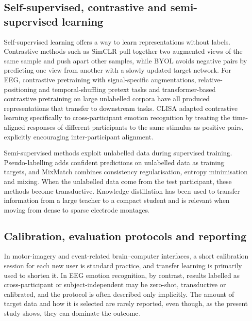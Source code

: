 \subsection{Self-supervised, contrastive and semi-supervised learning}
Self-supervised learning offers a way to learn representations without labels. Contrastive methods such as SimCLR pull together two augmented views of the same sample and push apart other samples\cite{simclr}, while BYOL avoids negative pairs by predicting one view from another with a slowly updated target network\cite{byol}. For EEG, contrastive pretraining with signal-specific augmentations\cite{mohsenvand}, relative-positioning and temporal-shuffling pretext tasks\cite{banville} and transformer-based contrastive pretraining on large unlabelled corpora\cite{bendr} have all produced representations that transfer to downstream tasks. CLISA adapted contrastive learning specifically to cross-participant emotion recognition by treating the time-aligned responses of different participants to the same stimulus as positive pairs, explicitly encouraging inter-participant alignment\cite{clisa}.

Semi-supervised methods exploit unlabelled data during supervised training. Pseudo-labelling adds confident predictions on unlabelled data as training targets\cite{pseudo}, and MixMatch combines consistency regularisation, entropy minimisation and mixing\cite{mixmatch}. When the unlabelled data come from the test participant, these methods become transductive. Knowledge distillation\cite{hinton} has been used to transfer information from a large teacher to a compact student and is relevant when moving from dense to sparse electrode montages.


\subsection{Calibration, evaluation protocols and reporting}
In motor-imagery and event-related brain–computer interfaces, a short calibration session for each new user is standard practice, and transfer learning is primarily used to shorten it\cite{lotte,jayaram,wu}. In EEG emotion recognition, by contrast, results labelled as cross-participant or subject-independent may be zero-shot, transductive or calibrated, and the protocol is often described only implicitly. The amount of target data and how it is selected are rarely reported, even though, as the present study shows, they can dominate the outcome.

